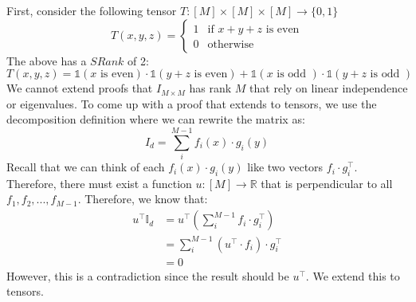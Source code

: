 \documentclass[11pt]{article}
\theoremstyle{definition}
\begin{document}
First, consider the following tensor $T: [M] \times [M] \times [M] \rightarrow \{0,1\}$
$$T(x,y,z) = \begin{cases} 1 & \text{if } x+y+z \text{ is even}\\0 & \text{otherwise} \end{cases}$$
The above has a $SRank$ of 2:
$$T(x,y,z) = \mathds{1}(x \text{ is even}) \cdot \mathds{1}(y+z \text{ is even}) + \mathds{1}(x \text{ is odd })\cdot \mathds{1}(y+z \text{ is odd })$$
We cannot extend proofs that $I_{M \times M}$ has rank $M$ that rely on linear independence or eigenvalues. To come up with a proof that extends to tensors, we use the decomposition definition where we can rewrite the matrix as:
$$I_{d} = \sum_i^{M-1}f_i(x) \cdot g_i(y)$$
Recall that we can think of each $f_i(x) \cdot g_i(y)$ like two vectors $f_i \cdot g_i^\top$. Therefore, there must exist a function $u: [M] \rightarrow \mathbb{R}$ that is perpendicular to all $f_1,f_2,...,f_{M-1}$. Therefore, we know that:
\begin{align*}
    u^\top \mathds{I}_d &= u^\top (\sum_i^{M-1}f_i \cdot g_i^\top)\\
    &= \sum_i^{M-1}(u^\top \cdot f_i) \cdot g_i^\top\\
    &= 0
\end{align*}
However, this is a contradiction since the result should be $u^\top$. We extend this to tensors.
\bigskip
\end{document}
